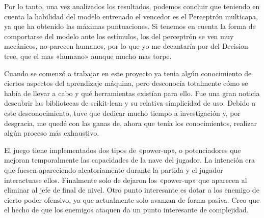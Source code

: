 Por lo tanto, una vez analizados los resultados, podemos concluir que teniendo en cuenta la habilidad del modelo entrenado el vencedor es el Perceptrón multicapa, ya que ha obtenido las máximas puntuaciones. Si tenemos en cuenta la forma de comportarse del modelo ante los estímulos, los del perceptrón se ven muy mecánicos, no parecen humanos, por lo que yo me decantaría por del Decision tree, que el mas  «humano» aunque mucho mas torpe.


Cuando se comenzó a trabajar en este proyecto ya tenia algún conocimiento de ciertos aspectos del aprendizaje máquina, pero desconocía totalmente cómo se había de llevar a cabo y qué herramientas existían para ello. Fue una gran noticia descubrir las bibliotecas de scikit-lean y su relativa simplicidad de uso. Debido a este desconocimiento, tuve que dedicar mucho tiempo a investigación y, por desgracia, me quedé con las ganas de, ahora que tenía los conocimientos, realizar algún proceso más exhaustivo. 

El juego tiene implementados dos tipos de «power-up», o potenciadores que mejoran temporalmente las capacidades de la nave del jugador. La intención era que fuesen apareciendo aleatoriamente durante la partida y el jugador interactuase ellos. Finalmente solo de dejaron los «power-up» que aparecen al eliminar al jefe de final de nivel. Otro punto interesante es dotar a los enemigo de cierto poder ofensivo, ya que actualmente solo avanzan de forma pasiva. Creo que el hecho de que los enemigos ataquen da un punto interesante de complejidad.